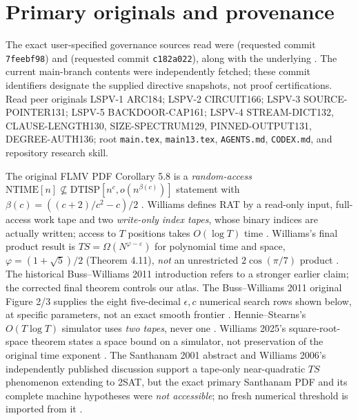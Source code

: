 \documentclass[11pt]{article}
\begin{document}
\section{Primary originals and provenance}
The exact user-specified governance sources read were  (requested commit \texttt{7feebf98}) and  (requested commit \texttt{c182a022}), along with the underlying . The current main-branch contents were independently fetched; these commit identifiers designate the supplied directive snapshots, not proof certifications. Read peer originals LSPV-1 ARC184; LSPV-2 CIRCUIT166; LSPV-3 SOURCE-POINTER131; LSPV-5 BACKDOOR-CAP161; LSPV-4 STREAM-DICT132, CLAUSE-LENGTH130, SIZE-SPECTRUM129, PINNED-OUTPUT131, DEGREE-AUTH136; root \texttt{main.tex}, \texttt{main13.tex}, \texttt{AGENTS.md}, \texttt{CODEX.md}, and repository research skill.

The original FLMV PDF Corollary 5.8 is a \emph{random-access} $\mathrm{NTIME}[n]\not\subseteq\mathrm{DTISP}[n^c,o(n^{\beta(c)})]$ statement with $\beta(c)=((c+2)/c^2-c)/2$ \cite{FLMV}. Williams defines RAT by a read-only input, full-access work tape and two \emph{write-only index tapes}, whose binary indices are actually written; access to $T$ positions takes $O(\log T)$ time \cite{Williams06}. Williams's final product result is $TS=\Omega(N^{\varphi-\varepsilon})$ for polynomial time and space, $\varphi=(1+\sqrt5)/2$ (Theorem 4.11), \emph{not} an unrestricted $2\cos(\pi/7)$ product \cite{Williams13}. The historical Buss--Williams 2011 introduction refers to a stronger earlier claim; the corrected final theorem controls our atlas. The Buss--Williams 2011 original Figure 2/3 supplies the eight five-decimal $\epsilon,c$ numerical search rows shown below, at specific parameters, not an exact smooth frontier \cite{BussWilliams}. Hennie--Stearns's $O(T\log T)$ simulator uses \emph{two tapes}, never one \cite{HS}. Williams 2025's square-root-space theorem states a space bound on a simulator, not preservation of the original time exponent \cite{Williams25}. The Santhanam 2001 abstract and Williams 2006's independently published discussion support a tape-only near-quadratic $TS$ phenomenon extending to 2SAT, but the exact primary Santhanam PDF and its complete machine hypotheses were \emph{not accessible}; no fresh numerical threshold is imported from it \cite{Santhanam,Williams06}.
\end{document}
